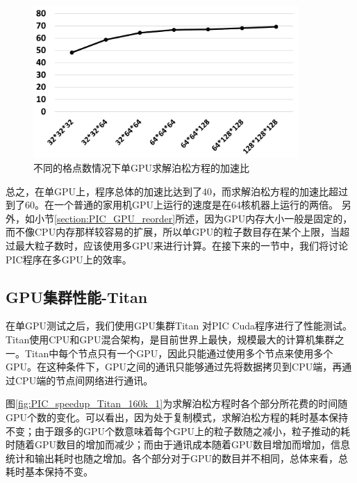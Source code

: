 \begin{figure}[!htb]
  \centering
  \includegraphics[width=0.9\textwidth]{Img/PIC_speedup_1GPU_Poisson.pdf}
  \caption{不同的格点数情况下单GPU求解泊松方程的加速比}
  \label{fig:PIC_speedup_1GPU_Poisson}
\end{figure}

总之，在单GPU上，程序总体的加速比达到了40，而求解泊松方程的加速比超过到了60。在一个普通的家用机GPU上运行的速度是在64核机器上运行的两倍。
另外，如小节\ref{section:PIC_GPU_reorder}所述，因为GPU内存大小一般是固定的，而不像CPU内存那样较容易的扩展，所以单GPU的粒子数目存在某个上限，当超过最大粒子数时，应该使用多GPU来进行计算。在接下来的一节中，我们将讨论PIC程序在多GPU上的效率。

\subsection{GPU集群性能-Titan}
在单GPU测试之后，我们使用GPU集群Titan 对PIC Cuda程序进行了性能测试。Titan使用CPU和GPU混合架构，是目前世界上最快，规模最大的计算机集群之一。Titan中每个节点只有一个GPU，因此只能通过使用多个节点来使用多个GPU。在这种条件下，GPU之间的通讯只能够通过先将数据拷贝到CPU端，再通过CPU端的节点间网络进行通讯。

图\ref{fig:PIC_speedup_Titan_160k_1}为求解泊松方程时各个部分所花费的时间随GPU个数的变化。可以看出，因为处于复制模式，求解泊松方程的耗时基本保持不变；由于跟多的GPU个数意味着每个GPU上的粒子数随之减小，粒子推动的耗时随着GPU数目的增加而减少；而由于通讯成本随着GPU数目增加而增加，信息统计和输出耗时也随之增加。各个部分对于GPU的数目并不相同，总体来看，总耗时基本保持不变。

